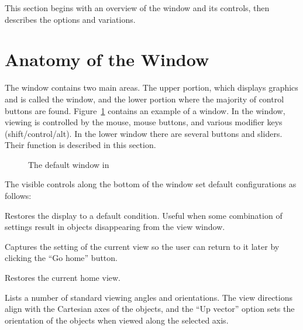 This section begins with an overview of the \viewer{} window and its
controls, then describes the options and variations.

\section{Anatomy of the \viewer{} Window}
\label{sec:viewer-anatomy} 

The \viewer{} window contains two main areas.  The upper portion,
which displays graphics and is called the \graphics{} window, and the
lower portion where the majority of control buttons are found.
Figure~\ref{fig:viewwindow} contains an example of a \viewer{} window.
In the \graphics{} window, viewing is controlled by the mouse, mouse
buttons, and various modifier keys (shift/control/alt).  In the lower
window there are several buttons and sliders. Their function is
described in this section.

\begin{figure}[htb]
  \begin{makeimage}
  \end{makeimage}
  \viewerwindow
  \caption{\label{fig:viewwindow} The default \viewer{} window in \SR{}}
\end{figure}


The visible controls along the bottom of the \viewer{} window set default
configurations as follows:
%
\begin{description}
   Restores the display to a default
  condition.  Useful when some combination of settings result in
  objects disappearing from the view window.
  
   Captures the setting of the current view
  so the user can return to it later by clicking the ``Go home''
  button.

   Restores the current home view.
  
   Lists a number of standard viewing angles
  and orientations.  The view directions align with the Cartesian axes
  of the objects, and the ``Up vector'' option sets the orientation of
  the objects when viewed along the selected axis.
\end{description}

